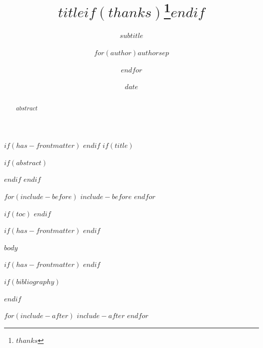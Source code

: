\documentclass[
$for(babel-otherlangs)$
  $babel-otherlangs$,
$endfor$
$if(babel-lang)$
  $babel-lang$,
$endif$
$if(fontsize)$
  $fontsize$,
$endif$
$if(papersize)$
  $papersize$paper,
$endif$
$for(classoption)$
  $classoption$$sep$,
$endfor$
]{$documentclass$}
\title{$title$$if(thanks)$\thanks{$thanks$}$endif$}
\subtitle{$subtitle$}
\author{$for(author)$$author$$sep$ \and $endfor$}
\date{$date$}
\numberwithin{equation}{section}
\begin{document}
$if(has-frontmatter)$
\frontmatter
$endif$
$if(title)$
\maketitle
$if(abstract)$
\begin{abstract}
$abstract$
\end{abstract}
$endif$
$endif$

$for(include-before)$
$include-before$
$endfor$

$if(toc)$
\setcounter{tocdepth}{$toc-depth$}
\tableofcontents
\newpage
$endif$

$if(has-frontmatter)$
\mainmatter
$endif$

$body$

$if(has-frontmatter)$
\backmatter
$endif$

$if(bibliography)$


$endif$

$for(include-after)$
$include-after$
$endfor$
\end{document}
